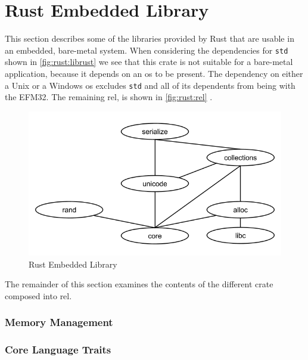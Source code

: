 \section{Rust Embedded Library}
\label{sec:rust_embedded_library}

This section describes some of the libraries provided by Rust that are usable in an embedded, bare-metal system.
When considering the dependencies for \texttt{std} shown in \autoref{fig:rust:librust} we see that this crate is not suitable for a bare-metal application, because it depends on an \gls{os} to be present.
The dependency on either a Unix or a Windows \gls{os} excludes \texttt{std} and all of its dependents from being with the EFM32.
The remaining \gls{rel}, is shown in \autoref{fig:rust:rel} .


\begin{figure}[H]
  \begin{center}
    \includegraphics[scale=0.3]{figures/background/rust/embedded-rust-lib.png}
  \end{center}
  \caption{Rust Embedded Library}
  \label{fig:rust:rel}
\end{figure}

The remainder of this section examines the contents of the different crate composed into \gls{rel}.

\subsubsection{Memory Management}
\subsubsection{Core Language Traits}

